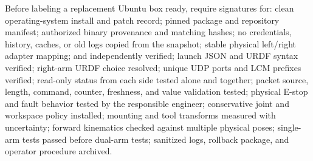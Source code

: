 \markdownRendererInterblockSeparator
{}Before labeling a replacement Ubuntu box ready, require signatures for:\markdownRendererInterblockSeparator
{}\markdownRendererUlBegin
\markdownRendererUlItem \markdownRendererUntickedBox{} clean operating-system install and patch record;\markdownRendererUlItemEnd 
\markdownRendererUlItem \markdownRendererUntickedBox{} pinned package and repository manifest;\markdownRendererUlItemEnd 
\markdownRendererUlItem \markdownRendererUntickedBox{} authorized binary provenance and matching hashes;\markdownRendererUlItemEnd 
\markdownRendererUlItem \markdownRendererUntickedBox{} no credentials, history, caches, or old logs copied from the snapshot;\markdownRendererUlItemEnd 
\markdownRendererUlItem \markdownRendererUntickedBox{} stable physical left/right adapter mapping;\markdownRendererUlItemEnd 
\markdownRendererUlItem \markdownRendererUntickedBox{}  and  independently verified;\markdownRendererUlItemEnd 
\markdownRendererUlItem \markdownRendererUntickedBox{} launch JSON and URDF syntax verified;\markdownRendererUlItemEnd 
\markdownRendererUlItem \markdownRendererUntickedBox{} right-arm URDF choice resolved;\markdownRendererUlItemEnd 
\markdownRendererUlItem \markdownRendererUntickedBox{} unique UDP ports and LCM prefixes verified;\markdownRendererUlItemEnd 
\markdownRendererUlItem \markdownRendererUntickedBox{} read-only status from each side tested alone and together;\markdownRendererUlItemEnd 
\markdownRendererUlItem \markdownRendererUntickedBox{} packet source, length, command, counter, freshness, and value validation tested;\markdownRendererUlItemEnd 
\markdownRendererUlItem \markdownRendererUntickedBox{} physical E-stop and fault behavior tested by the responsible engineer;\markdownRendererUlItemEnd 
\markdownRendererUlItem \markdownRendererUntickedBox{} conservative joint and workspace policy installed;\markdownRendererUlItemEnd 
\markdownRendererUlItem \markdownRendererUntickedBox{} mounting and tool transforms measured with uncertainty;\markdownRendererUlItemEnd 
\markdownRendererUlItem \markdownRendererUntickedBox{} forward kinematics checked against multiple physical poses;\markdownRendererUlItemEnd 
\markdownRendererUlItem \markdownRendererUntickedBox{} single-arm tests passed before dual-arm tests;\markdownRendererUlItemEnd 
\markdownRendererUlItem \markdownRendererUntickedBox{} sanitized logs, rollback package, and operator procedure archived.\markdownRendererUlItemEnd 
\markdownRendererUlEnd \markdownRendererInterblockSeparator
